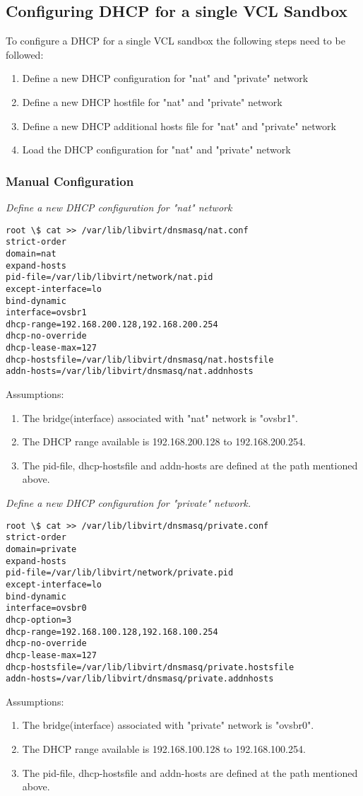 \documentclass[12pt]{extarticle}
\begin{document}
\subsection{Configuring DHCP for a single VCL Sandbox}
To configure a DHCP for a single VCL sandbox the following steps need to be followed:
\begin{enumerate}
    \item Define a new DHCP configuration for "nat" and "private" network
    \item Define a new DHCP hostfile for "nat" and "private" network
    \item Define a new DHCP additional hosts file for "nat" and "private" network
    \item Load the DHCP configuration for "nat" and "private" network
\end{enumerate}

\subsubsection{Manual Configuration}

\noindent
\textit{Define a new DHCP configuration for "nat" network}
\begin{verbatim}
root \$ cat >> /var/lib/libvirt/dnsmasq/nat.conf
strict-order
domain=nat
expand-hosts
pid-file=/var/lib/libvirt/network/nat.pid
except-interface=lo
bind-dynamic
interface=ovsbr1
dhcp-range=192.168.200.128,192.168.200.254
dhcp-no-override
dhcp-lease-max=127
dhcp-hostsfile=/var/lib/libvirt/dnsmasq/nat.hostsfile
addn-hosts=/var/lib/libvirt/dnsmasq/nat.addnhosts
\end{verbatim}
Assumptions:
\begin{enumerate}
\item The bridge(interface) associated with "nat" network is "ovsbr1".
\item The DHCP range available is 192.168.200.128 to 192.168.200.254.
\item The pid-file, dhcp-hostsfile and addn-hosts are defined at the path mentioned above.
\end{enumerate}

\noindent
\textit{Define a new DHCP configuration for "private" network.}
\begin{verbatim}
root \$ cat >> /var/lib/libvirt/dnsmasq/private.conf
strict-order
domain=private
expand-hosts
pid-file=/var/lib/libvirt/network/private.pid
except-interface=lo
bind-dynamic
interface=ovsbr0
dhcp-option=3
dhcp-range=192.168.100.128,192.168.100.254
dhcp-no-override
dhcp-lease-max=127
dhcp-hostsfile=/var/lib/libvirt/dnsmasq/private.hostsfile
addn-hosts=/var/lib/libvirt/dnsmasq/private.addnhosts
\end{verbatim}
Assumptions:
\begin{enumerate}
\item The bridge(interface) associated with "private" network is "ovsbr0".
\item The DHCP range available is 192.168.100.128 to 192.168.100.254.
\item The pid-file, dhcp-hostsfile and addn-hosts are defined at the path mentioned above.
\end{enumerate}
\end{document}
